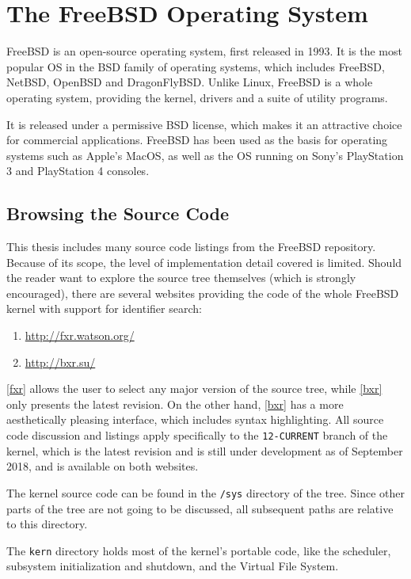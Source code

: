 \documentclass[shortabstract, english]{iithesis}
\begin{document}
\section{The FreeBSD Operating System}

FreeBSD \cite{bib:freebsd} is an open-source operating system, first released in
1993. It is the most popular OS in the BSD family of operating systems, which
includes FreeBSD, NetBSD, OpenBSD and DragonFlyBSD. Unlike Linux, FreeBSD is a
whole operating system, providing the kernel, drivers and a suite of utility
programs.

It is released under a permissive BSD license, which makes it an attractive
choice for commercial applications. FreeBSD has been used as the basis for
operating systems such as Apple's MacOS, as well as the OS running on Sony's
PlayStation 3 and PlayStation 4 consoles.

\subsection{Browsing the Source Code}

This thesis includes many source code listings from the FreeBSD repository.
Because of its scope, the level of implementation detail covered is limited.
Should the reader want to explore the source tree themselves (which is strongly
encouraged), there are several websites providing the code of the whole FreeBSD
kernel with support for identifier search:
\begin{enumerate}[label=\textnormal{(\arabic*)}]
\item \url{http://fxr.watson.org/}\label{fxr}
\item \url{http://bxr.su/}\label{bxr}
\end{enumerate}

\ref{fxr} allows the user to select any major version of the source tree, while
\ref{bxr} only presents the latest revision. On the other hand, \ref{bxr} has a
more aesthetically pleasing interface, which includes syntax highlighting. All
source code discussion and listings apply specifically to the
\texttt{12-CURRENT} branch of the kernel, which is the latest revision and is
still under development as of September 2018, and is available on both websites.

The kernel source code can be found in the \texttt{/sys} directory of the tree.
Since other parts of the tree are not going to be discussed, all subsequent
paths are relative to this directory.

The \texttt{kern} directory holds most of the kernel's portable code, like the
scheduler, subsystem initialization and shutdown, and the Virtual File System.
\end{document}
